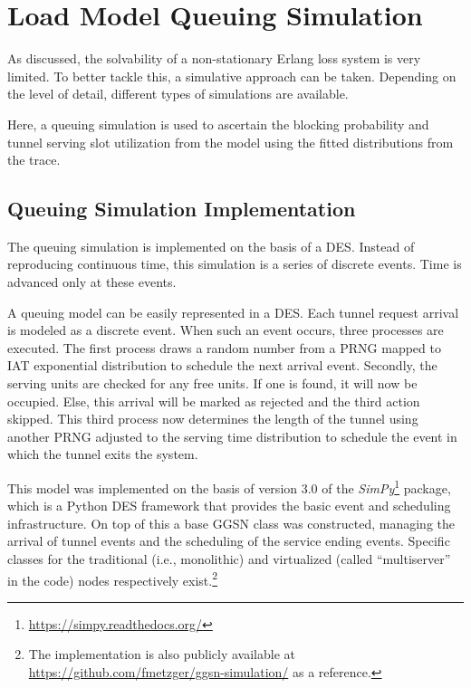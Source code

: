 \section{Load Model Queuing Simulation} 
\label{c4:sec:simulation}

As discussed, the solvability of a non-stationary Erlang loss system is very limited. To better tackle this, a simulative approach can be taken. Depending on the level of detail, different types of simulations are available.

Here, a queuing simulation is used to ascertain the blocking probability and tunnel serving slot utilization from the model using the fitted distributions from the trace.


\subsection{Queuing Simulation Implementation}

The queuing simulation is implemented on the basis of a \gls{DES}. Instead of reproducing continuous time, this simulation is a series of discrete events. Time is advanced only at these events. 

A queuing model can be easily represented in a \gls{DES}.  Each tunnel request arrival is modeled as a discrete event. When such an event occurs, three processes are executed. The first process draws a random number from a \gls{PRNG} mapped to \gls{IAT} exponential distribution to schedule the next arrival event. Secondly, the serving units are checked for any free units. If one is found, it will now be occupied. Else, this arrival will be marked as rejected and the third action skipped. This third process now determines the length of the tunnel using another \gls{PRNG} adjusted to the serving time distribution to schedule the event in which the tunnel exits the system.

This model was implemented on the basis of version 3.0 of the \textit{SimPy}\footnote{\url{https://simpy.readthedocs.org/}} package, which is a Python \gls{DES} framework that provides the basic event and scheduling infrastructure. On top of this a base \gls{GGSN} class was constructed, managing the arrival of tunnel events and the scheduling of the service ending events. Specific classes for the traditional (i.e., monolithic) and virtualized (called ``multiserver'' in the code) nodes respectively exist.\footnote{The implementation is also publicly available at \url{https://github.com/fmetzger/ggsn-simulation/} as a reference.}


